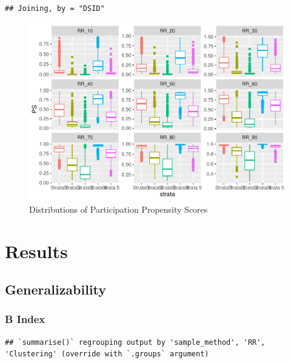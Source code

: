\documentclass[
  english,
  man,floatsintext]{apa6}
\begin{document}
\begin{verbatim}
## Joining, by = "DSID"
\end{verbatim}

\begin{figure}
\centering
\includegraphics{5---Analysis_files/figure-latex/unnamed-chunk-12-3.pdf}
\caption{\label{fig:unnamed-chunk-12-3}Distributions of Participation Propensity Scores}
\end{figure}

\hypertarget{results}{%
\section{Results}\label{results}}

\hypertarget{generalizability}{%
\subsection{Generalizability}\label{generalizability}}

\hypertarget{b-index}{%
\subsubsection{B Index}\label{b-index}}

\begin{verbatim}
## `summarise()` regrouping output by 'sample_method', 'RR', 'Clustering' (override with `.groups` argument)
\end{verbatim}
\end{document}
